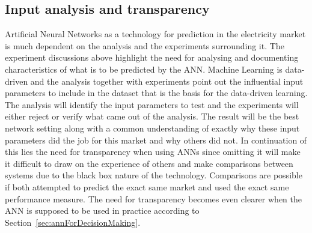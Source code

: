 \subsection{Input analysis and transparency}
Artificial Neural Networks as a technology for prediction in the electricity market is much dependent on the analysis and the experiments surrounding it. The experiment discussions above highlight the need for analysing and documenting characteristics of what is to be predicted by the ANN. Machine Learning is data-driven\cite{18} and the analysis together with experiments point out the influential input parameters to include in the dataset that is the basis for the data-driven learning. The analysis will identify the input parameters to test and the experiments will either reject or verify what came out of the analysis. The result will be the best network setting along with a common understanding of exactly why these input parameters did the job for this market and why others did not. In continuation of this lies the need for transparency when using ANNs since omitting it will make it difficult to draw on the experience of others and make comparisons between systems due to the black box nature of the technology. Comparisons are possible if both attempted to predict the exact same market and used the exact same performance measure. The need for transparency becomes even clearer when the ANN is supposed to be used in practice according to Section~\ref{sec:annForDecisionMaking}. 


